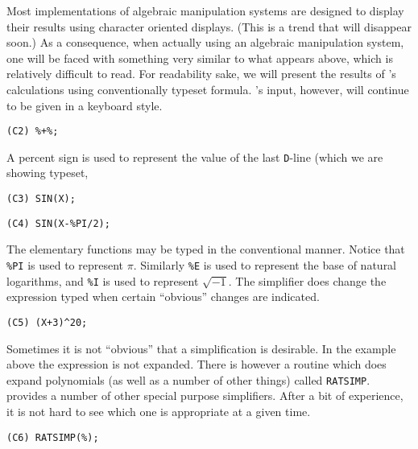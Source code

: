 Most implementations of algebraic manipulation systems are designed to
display their results using character oriented displays.  (This is a
trend that will disappear soon.)  As a consequence, when actually using an
algebraic manipulation system, one will be faced with something very similar to
what appears above, which is relatively difficult to read.  For
readability sake, we will present the results of {\Macsyma}'s
calculations using conventionally typeset formula.  {\Macsyma}'s input, however, will continue to be
given in a keyboard style.

\begin{verbatim}
(C2) %+%;
\end{verbatim}
A percent sign is used to represent the value of the last {\tt D}-line (which
we are showing typeset, 
\begin{verbatim}
(C3) SIN(X);
\end{verbatim}
\begin{verbatim}
(C4) SIN(X-%PI/2);
\end{verbatim}
The elementary functions may be typed in the conventional manner.  Notice that
{\tt\%PI} is used to represent $\pi$.  Similarly {\tt\%E} is used to represent
the base of natural logarithms, and {\tt\%I} is used to represent $\sqrt{-1}$.
The simplifier does change the expression typed when certain ``obvious'' changes
are indicated.
\begin{verbatim}
(C5) (X+3)^20;
\end{verbatim}
Sometimes it is not ``obvious'' that a simplification is desirable.
In the example above the expression is not expanded.  There is however
a routine which does expand polynomials (as well as a number of other
things) called {\tt RATSIMP}.  {\Macsyma} provides a number of other
special purpose simplifiers. After a bit of experience, it is not hard
to see which one is appropriate at a given time.
\begin{verbatim}
(C6) RATSIMP(%);
\end{verbatim}

